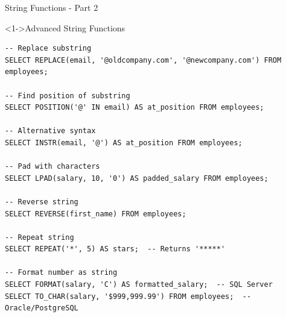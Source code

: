 \documentclass[aspectratio=169,11pt]{beamer}
\begin{document}
\begin{frame}[fragile]{String Functions - Part 2}
\begin{exampleblock}<1->{Advanced String Functions}
\begin{lstlisting}
-- Replace substring
SELECT REPLACE(email, '@oldcompany.com', '@newcompany.com') FROM employees;

-- Find position of substring
SELECT POSITION('@' IN email) AS at_position FROM employees;

-- Alternative syntax
SELECT INSTR(email, '@') AS at_position FROM employees;

-- Pad with characters
SELECT LPAD(salary, 10, '0') AS padded_salary FROM employees;

-- Reverse string
SELECT REVERSE(first_name) FROM employees;

-- Repeat string
SELECT REPEAT('*', 5) AS stars;  -- Returns '*****'

-- Format number as string
SELECT FORMAT(salary, 'C') AS formatted_salary;  -- SQL Server
SELECT TO_CHAR(salary, '$999,999.99') FROM employees;  -- Oracle/PostgreSQL
\end{lstlisting}
\end{exampleblock}
\end{frame}
\end{document}
